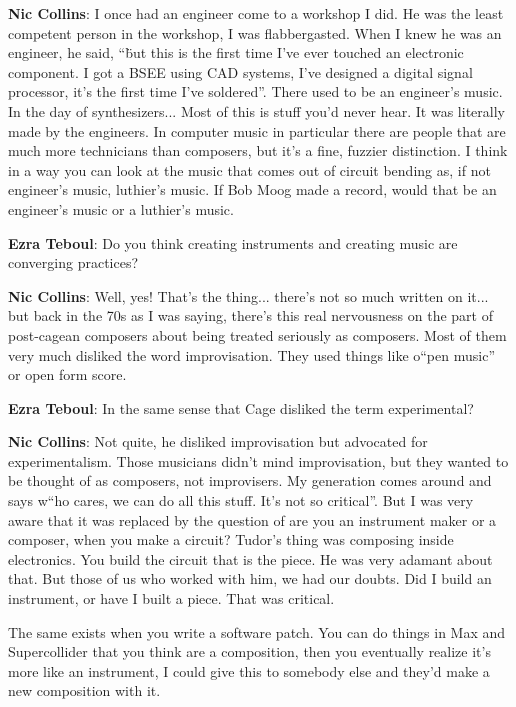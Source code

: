 \textbf{Nic Collins}: I once had an engineer come to a workshop I did. He was the least competent person in the workshop, I was flabbergasted. When I knew he was an engineer, he said, ``b̈ut this is the first time I’ve ever touched an electronic component. I got a BSEE using CAD systems, I’ve designed a digital signal processor, it’s the first time I’ve soldered''. There used to be an engineer’s music. In the day of synthesizers... Most of this is stuff you’d never hear. It was literally made by the engineers. In computer music in particular there are people that are much more technicians than composers, but it’s a fine, fuzzier distinction. I think in a way you can look at the music that comes out of circuit bending as, if not engineer’s music, luthier’s music. If Bob Moog made a record, would that be an engineer’s music or a luthier’s music.
					
\textbf{Ezra Teboul}: Do you think creating instruments and creating music are converging practices?
					
\textbf{Nic Collins}: Well, yes! That’s the thing... there’s not so much written on it... but back in the 70s as I was saying, there’s this real nervousness on the part of post-cagean composers about being treated seriously as composers. Most of them very much disliked the word improvisation. They used things like o``pen music'' or open form score.
					
\textbf{Ezra Teboul}: In the same sense that Cage disliked the term experimental?
					
\textbf{Nic Collins}: Not quite, he disliked improvisation but advocated for experimentalism. Those musicians didn’t mind improvisation, but they wanted to be thought of as composers, not improvisers. My generation comes around and says w``ho cares, we can do all this stuff. It’s not so critical''. But I was very aware that it was replaced by the question of are you an instrument maker or a composer, when you make a circuit? Tudor’s thing was composing inside electronics. You build the circuit that is the piece. He was very adamant about that. But those of us who worked with him, we had our doubts. Did I build an instrument, or have I built a piece. That was critical.		
						
The same exists when you write a software patch. You can do things in Max and Supercollider that you think are a composition, then you eventually realize it’s more like an instrument, I could give this to somebody else and they’d make a new composition with it.
					
